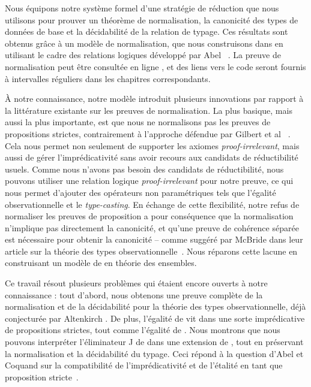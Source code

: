 Nous équipons notre système formel d'une stratégie de réduction que nous utilisons 
pour prouver un théorème de normalisation, la canonicité des types de données de 
base et la décidabilité de la relation de typage. 
% 
Ces résultats sont obtenus grâce à un modèle de normalisation, que nous construisons 
dans \Agda en utilisant le cadre des relations logiques développé par Abel 
\etal~. 
% 
La preuve de normalisation peut être consultée en ligne , 
et des liens vers le code seront fournis à intervalles réguliers dans les chapitres 
correspondants.

À notre connaissance, notre modèle introduit plusieurs innovations par rapport 
à la littérature existante sur les preuves de normalisation. 
% 
La plus basique, mais aussi la plus importante, est que nous ne normalisons pas 
les preuves de propositions strictes, contrairement à l'approche défendue par 
Gilbert et al \etal~. 
% 
Cela nous permet non seulement de supporter les axiomes \emph{proof-irrelevant}, 
mais aussi de gérer l'imprédicativité sans avoir recours aux candidats de 
réductibilité usuels. 
% 
Comme nous n'avons pas besoin des candidats de réductibilité, nous pouvons 
utiliser une relation logique \emph{proof-irrelevant} pour notre preuve, ce 
qui nous permet d'ajouter des opérateurs non paramétriques tels que l'égalité 
observationnelle et le \emph{type-casting}. 
% 
En échange de cette flexibilité, notre refus de normaliser les preuves de
proposition a pour conséquence que la normalisation n'implique pas directement 
la canonicité, et qu'une preuve de cohérence séparée est nécessaire pour 
obtenir la canonicité -- comme suggéré par McBride \etal dans leur article sur 
la théorie des types observationnelle~. 
% 
Nous réparons cette lacune en construisant un modèle de \SetoidCC en théorie 
des ensembles. 

Ce travail résout plusieurs problèmes qui étaient encore ouverts à notre 
connaissance : tout d'abord, nous obtenons une preuve complète de la 
normalisation et de la décidabilité pour la théorie des types observationnelle, 
déjà conjecturée par Altenkirch \etal. 
% 
De plus, l'égalité de \SetoidCC vit dans une sorte imprédicative de propositions 
strictes, tout comme l'égalité de \Lean. 
% 
Nous montrons que nous pouvons interpréter l'éliminateur J de \Lean dans une 
extension de \SetoidCC, tout en préservant la normalisation et la décidabilité 
du typage. 
% 
Ceci répond à la question d'Abel et Coquand sur la compatibilité de 
l'imprédicativité et de l'étalité en tant que proposition stricte~.

